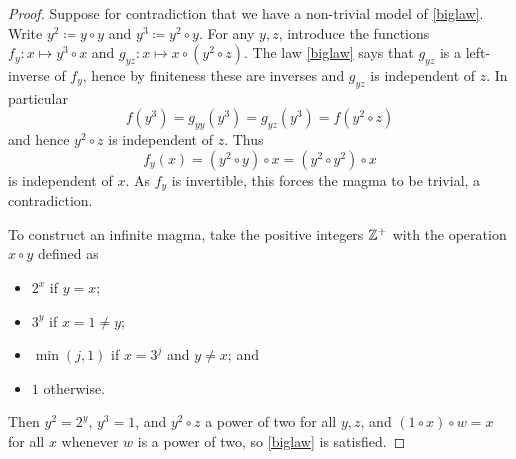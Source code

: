 \begin{proof}  Suppose for contradiction that we have a non-trivial model of \eqref{biglaw}. Write $y^2 \coloneqq y \circ y$ and $y^3 \coloneqq y^2 \circ y$. For any $y,z$, introduce the functions $f_y: x \mapsto y^3 \circ x$ and $g_{yz}: x \mapsto x \circ (y^2 \circ z)$.  The law \eqref{biglaw} says that $g_{yz}$ is a left-inverse of $f_y$, hence by finiteness these are inverses and $g_{yz}$ is independent of $z$. In particular
$$ f(y^3) = g_{yy}(y^3) = g_{yz}(y^3) = f(y^2 \circ z)$$
and hence $y^2 \circ z$ is independent of $z$.  Thus
$$ f_y(x) = (y^2 \circ y) \circ x = (y^2 \circ y^2) \circ x$$
is independent of $x$.  As $f_y$ is invertible, this forces the magma to be trivial, a contradiction.

To construct an infinite magma, take the positive integers $\mathbb{Z}^+$ with the operation $x \circ y$ defined as
\begin{itemize}
  \item $2^x$ if $y=x$;
  \item $3^y$ if $x = 1 \neq y$;
  \item $\min(j,1)$ if $x=3^j$ and $y \neq x$; and
  \item $1$ otherwise.
\end{itemize}
Then $y^2 = 2^y$, $y^3 = 1$, and $y^2 \circ z$ a power of two for all $y, z$, and $(1 \circ x) \circ w = x$ for all $x$ whenever $w$ is a power of two, so \eqref{biglaw} is satisfied.
\end{proof}
